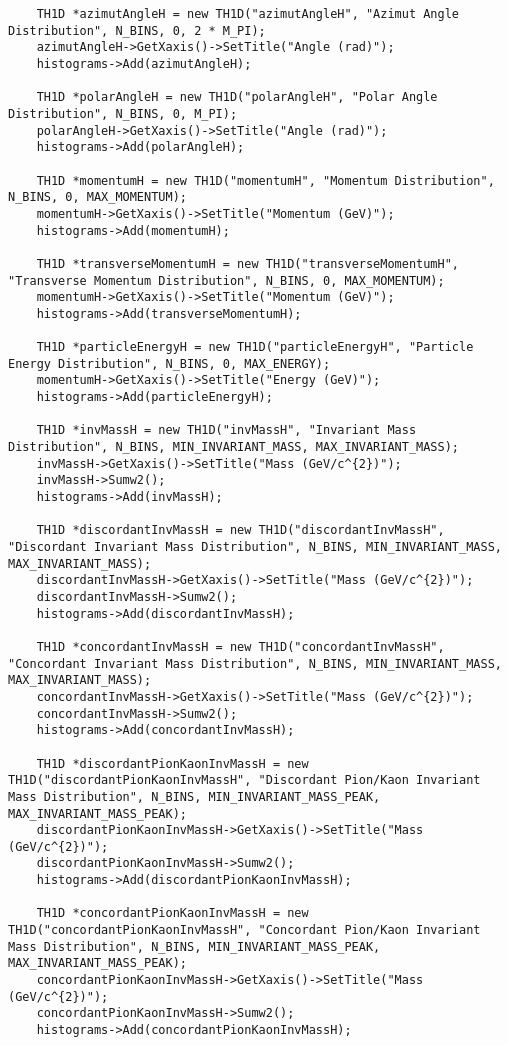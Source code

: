 \documentclass{article}
\begin{document}
\begin{verbatim}
    TH1D *azimutAngleH = new TH1D("azimutAngleH", "Azimut Angle Distribution", N_BINS, 0, 2 * M_PI);
    azimutAngleH->GetXaxis()->SetTitle("Angle (rad)");
    histograms->Add(azimutAngleH);

    TH1D *polarAngleH = new TH1D("polarAngleH", "Polar Angle Distribution", N_BINS, 0, M_PI);
    polarAngleH->GetXaxis()->SetTitle("Angle (rad)");
    histograms->Add(polarAngleH);

    TH1D *momentumH = new TH1D("momentumH", "Momentum Distribution", N_BINS, 0, MAX_MOMENTUM);
    momentumH->GetXaxis()->SetTitle("Momentum (GeV)");
    histograms->Add(momentumH);

    TH1D *transverseMomentumH = new TH1D("transverseMomentumH", "Transverse Momentum Distribution", N_BINS, 0, MAX_MOMENTUM);
    momentumH->GetXaxis()->SetTitle("Momentum (GeV)");
    histograms->Add(transverseMomentumH);

    TH1D *particleEnergyH = new TH1D("particleEnergyH", "Particle Energy Distribution", N_BINS, 0, MAX_ENERGY);
    momentumH->GetXaxis()->SetTitle("Energy (GeV)");
    histograms->Add(particleEnergyH);

    TH1D *invMassH = new TH1D("invMassH", "Invariant Mass Distribution", N_BINS, MIN_INVARIANT_MASS, MAX_INVARIANT_MASS);
    invMassH->GetXaxis()->SetTitle("Mass (GeV/c^{2})");
    invMassH->Sumw2();
    histograms->Add(invMassH);

    TH1D *discordantInvMassH = new TH1D("discordantInvMassH", "Discordant Invariant Mass Distribution", N_BINS, MIN_INVARIANT_MASS, MAX_INVARIANT_MASS);
    discordantInvMassH->GetXaxis()->SetTitle("Mass (GeV/c^{2})");
    discordantInvMassH->Sumw2();
    histograms->Add(discordantInvMassH);

    TH1D *concordantInvMassH = new TH1D("concordantInvMassH", "Concordant Invariant Mass Distribution", N_BINS, MIN_INVARIANT_MASS, MAX_INVARIANT_MASS);
    concordantInvMassH->GetXaxis()->SetTitle("Mass (GeV/c^{2})");
    concordantInvMassH->Sumw2();
    histograms->Add(concordantInvMassH);

    TH1D *discordantPionKaonInvMassH = new TH1D("discordantPionKaonInvMassH", "Discordant Pion/Kaon Invariant Mass Distribution", N_BINS, MIN_INVARIANT_MASS_PEAK, MAX_INVARIANT_MASS_PEAK);
    discordantPionKaonInvMassH->GetXaxis()->SetTitle("Mass (GeV/c^{2})");
    discordantPionKaonInvMassH->Sumw2();
    histograms->Add(discordantPionKaonInvMassH);

    TH1D *concordantPionKaonInvMassH = new TH1D("concordantPionKaonInvMassH", "Concordant Pion/Kaon Invariant Mass Distribution", N_BINS, MIN_INVARIANT_MASS_PEAK, MAX_INVARIANT_MASS_PEAK);
    concordantPionKaonInvMassH->GetXaxis()->SetTitle("Mass (GeV/c^{2})");
    concordantPionKaonInvMassH->Sumw2();
    histograms->Add(concordantPionKaonInvMassH);


\end{verbatim}
\end{document}

